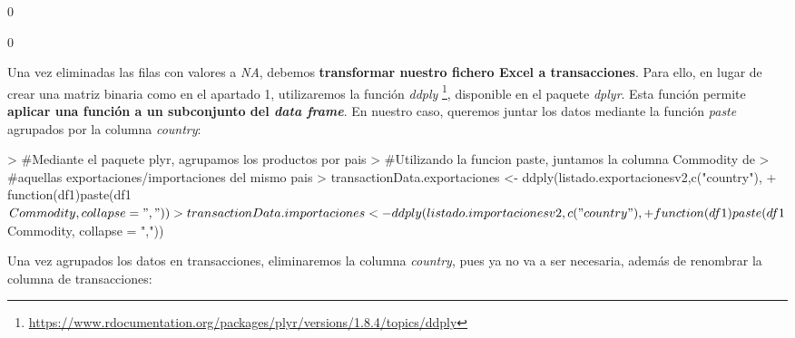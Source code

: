 \documentclass [a4paper] {article}
\begin{document}
{\small
\begin{Schunk}
\begin{Soutput}
[1] 0
\end{Soutput}
\begin{Soutput}
[1] 0
\end{Soutput}
\end{Schunk}
}

Una vez eliminadas las filas con valores a \textit{NA}, debemos \textbf{transformar nuestro fichero Excel a transacciones}. Para ello, en lugar de crear una matriz binaria como en el apartado 1, utilizaremos la
función \textit{ddply} \footnote{\url{https://www.rdocumentation.org/packages/plyr/versions/1.8.4/topics/ddply}}, disponible en el paquete \textit{dplyr}. Esta función permite \textbf{aplicar una función a un
subconjunto del \textit{data frame}}. En nuestro caso, queremos juntar los datos mediante la función \textit{paste} agrupados por la columna \textit{country}:

\begin{Schunk}
\begin{Sinput}
> #Mediante el paquete plyr, agrupamos los productos por pais
> #Utilizando la funcion paste, juntamos la columna Commodity de
> #aquellas exportaciones/importaciones del mismo pais
> transactionData.exportaciones <- ddply(listado.exportacionesv2,c("country"), 
+ function(df1)paste(df1$Commodity, collapse = ","))
> transactionData.importaciones <- ddply(listado.importacionesv2,c("country"), 
+ function(df1)paste(df1$Commodity, collapse = ","))
\end{Sinput}
\end{Schunk}

Una vez agrupados los datos en transacciones, eliminaremos la columna \textit{country}, pues ya no va a ser necesaria, además de renombrar la columna de transacciones:
\end{document}
